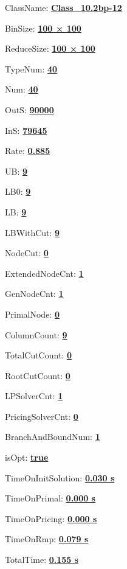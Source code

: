 \documentclass[11pt]{article}
\begin{document}
\pagestyle{empty}


ClassName: \underline{\textbf{Class_10.2bp-12}}
\par
BinSize: \underline{\textbf{100 × 100}}
\par
ReduceSize: \underline{\textbf{100 × 100}}
\par
TypeNum: \underline{\textbf{40}}
\par
Num: \underline{\textbf{40}}
\par
OutS: \underline{\textbf{90000}}
\par
InS: \underline{\textbf{79645}}
\par
Rate: \underline{\textbf{0.885}}
\par
UB: \underline{\textbf{9}}
\par
LB0: \underline{\textbf{9}}
\par
LB: \underline{\textbf{9}}
\par
LBWithCut: \underline{\textbf{9}}
\par
NodeCut: \underline{\textbf{0}}
\par
ExtendedNodeCnt: \underline{\textbf{1}}
\par
GenNodeCnt: \underline{\textbf{1}}
\par
PrimalNode: \underline{\textbf{0}}
\par
ColumnCount: \underline{\textbf{9}}
\par
TotalCutCount: \underline{\textbf{0}}
\par
RootCutCount: \underline{\textbf{0}}
\par
LPSolverCnt: \underline{\textbf{1}}
\par
PricingSolverCnt: \underline{\textbf{0}}
\par
BranchAndBoundNum: \underline{\textbf{1}}
\par
isOpt: \underline{\textbf{true}}
\par
TimeOnInitSolution: \underline{\textbf{0.030 s}}
\par
TimeOnPrimal: \underline{\textbf{0.000 s}}
\par
TimeOnPricing: \underline{\textbf{0.000 s}}
\par
TimeOnRmp: \underline{\textbf{0.079 s}}
\par
TotalTime: \underline{\textbf{0.155 s}}
\par
\newpage


\end{document}
